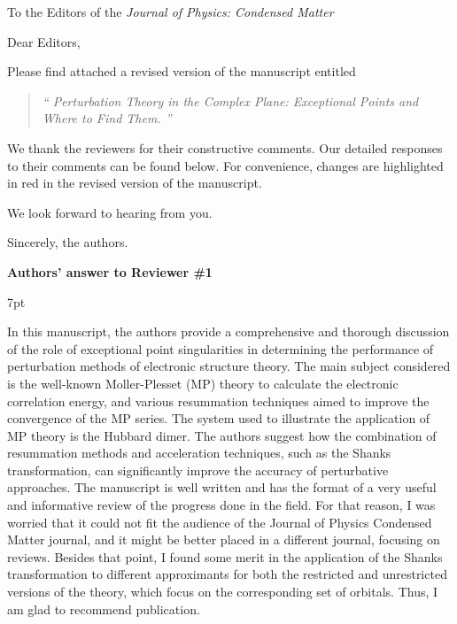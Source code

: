 \documentclass[10pt]{letter}
\renewenvironment{quote}
{\begin{quotation}\noindent\it``\ignorespaces}
{\ignorespaces''\end{quotation}}
\newenvironment{formal}{%
  \def\FrameCommand{%
    \hspace{1pt}%
    {\color{darkblue}\vrule width 2pt}%
    {\color{formalshade}\vrule width 4pt}%
    \colorbox{formalshade}%
  }%
  \MakeFramed{\advance\hsize-\width\FrameRestore}%
  \noindent\hspace{-4.55pt}%
  \begin{adjustwidth}{}{7pt}%
  \vspace{2pt}\vspace{2pt}%
}
{%
  \vspace{2pt}\end{adjustwidth}\endMakeFramed%
}
\begin{document}
\begin{letter}%
{To the Editors of the \textit{Journal of Physics: Condensed Matter}}

\opening{Dear Editors,}

\justifying
Please find attached a revised version of the manuscript entitled 
\begin{quote}
	\textit{Perturbation Theory in the Complex Plane: Exceptional Points and Where to Find Them.}
\end{quote}
We thank the reviewers for their constructive comments.
Our detailed responses to their comments can be found below.
For convenience, changes are highlighted in red in the revised version of the manuscript. 

We look forward to hearing from you.

\closing{Sincerely, the authors.}

\newpage
\noindent \textbf{\large Authors' answer to Reviewer \#1}

\begin{formal}
In this manuscript, the authors provide a comprehensive and thorough discussion of the role of exceptional point singularities in determining the performance of perturbation methods of electronic structure theory. 
The main subject considered is the well-known Moller-Plesset (MP) theory to calculate the electronic correlation energy, and various resummation techniques aimed to improve the convergence of the MP series. 
The system used to illustrate the application of MP theory is the Hubbard dimer. 
The authors suggest how the combination of resummation methods and acceleration techniques, such as the Shanks transformation, can significantly improve the accuracy of perturbative approaches. 
The manuscript is well written and has the format of a very useful and informative review of the progress done in the field. 
For that reason, I was worried that it could not fit the audience of the Journal of Physics Condensed Matter journal, and it might be better placed in a different journal, focusing on reviews. 
Besides that point, I found some merit in the application of the Shanks transformation to different approximants for both the restricted and unrestricted versions of the theory, which focus on the corresponding set of orbitals. 
Thus, I am glad to recommend publication.
\end{formal}



\end{letter}
\end{document}
